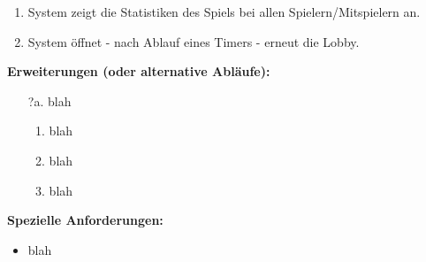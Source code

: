 \documentclass[11pt,ngerman]{article}
\begin{document}
\begin{tcolorbox}
\begin{enumerate}[resume]
                    \item System zeigt die Statistiken des Spiels bei allen Spielern/Mitspielern an.
                    \item System öffnet - nach Ablauf eines Timers  - erneut die \Gls{Lobby}.
                \end{enumerate}
                \textbf{Erweiterungen (oder alternative Abläufe):}
                \begin{itemize}
                    \item[?a.] blah
                        \begin{enumerate}
                            \item blah
                            \item blah
                            \item blah
                        \end{enumerate}
                \end{itemize}
                \textbf{Spezielle Anforderungen:}
                 \begin{itemize}
                    \item blah
                \end{itemize}

            \end{tcolorbox}

        \newpage
\end{document}
